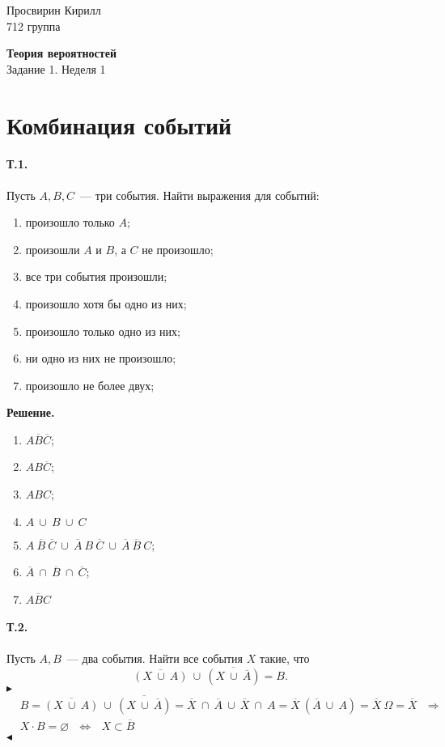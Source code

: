 \documentclass[a4paper,12pt]{article} %
\newcommand{\ol}[1]{\overline{#1}}
\begin{document}

\hfill
\begin{minipage}{4cm}
	Просвирин Кирилл\\
	712 группа\\
\end{minipage}

\begin{center}
	\Large\textbf{Теория вероятностей\\} 
	\large Задание 1. Неделя 1
\end{center}

\section{Комбинация событий}

\paragraph{Т.1.} Пусть $ A, B, C $~--- три события. 
Найти выражения для событий:
\begin{enumerate}
	\item произошло только $ A $;
	\item произошли $ A $ и $ B $, а $ C $ не произошло;
	\item все три события произошли;
	\item произошло хотя бы одно из них;
	\item произошло только одно из них;
	\item ни одно из них не произошло;
	\item произошло не более двух;
\end{enumerate}

\textbf{Решение.}

\begin{enumerate}
	\item $ A\overline{B}\overline{C} $;
	\item $ AB\overline{C} $;
	\item $ ABC $;
	\item $ A~\cup~B~\cup~C $
	\item $ A~\overline{B}~\overline{C}~
	\cup~\overline{A}~B~\overline{C}~
	\cup~\overline{A}~\overline{B}~C $;
	\item $ \overline{A}~\cap~\overline{B}~\cap~\overline{C} $;
	\item $ \overline{ABC} $
\end{enumerate}

\paragraph{Т.2.} Пусть $ A, B $~--- два события. 
Найти все события $ X $ такие, что
\[
	\overline{(X~\cup~A)}~\cup~\overline{(X~\cup~\overline{A})}=B.
\]
$ \blacktriangleright $
\begin{align}&
	B=\overline{(X~\cup~A)}~\cup~\overline{(X~\cup~\overline{A})}=
	\ol{X}~\cap~\ol{A}~\cup~\ol{X}~\cap~A=
	\ol{X}~(\ol{A}~\cup~A)=\ol{X}~\Omega=\ol{X}~~~\Longrightarrow\\
	&X\cdot B=\varnothing~~~\Longleftrightarrow~~~X\subset\ol{B}	
\end{align}\hfill$ \blacktriangleleft $
\end{document}
